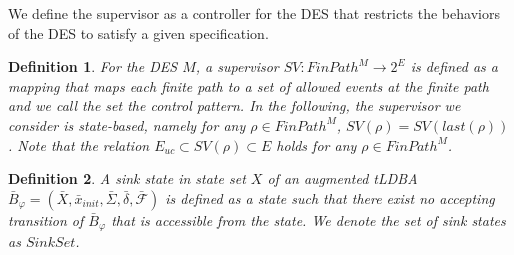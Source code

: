 \documentclass[letterpaper, 10 pt, conference, dvipdfmx]{ieeeconf}
\newtheorem{definition}{Definition}
\begin{document}
We define the supervisor as a controller for the DES that restricts the behaviors of the DES to satisfy a given specification.

\begin{definition}
For the DES $M$,  a supervisor $SV : FinPath^{M} \rightarrow 2^E$ is defined as a mapping that maps each finite path to a set of allowed events at the finite path and we call the set the control pattern. In the following, the supervisor we consider is {\it state-based}, namely for any $\rho \in FinPath^{M}$, $SV(\rho) = SV(last(\rho))$. Note that the relation $E_{uc} \subset SV(\rho) \subset E$ holds for any $\rho \in FinPath^M$.
\end{definition}

\begin{definition}
  A sink state in state set $X$ of an augmented tLDBA $\bar{B}_{\varphi} = (\bar{X}, \bar{x}_{init},\bar{\Sigma},\bar{\delta},\bar{\mathcal{F}})$ is defined as a state such that there exist no accepting transition of $\bar{B}_{\varphi}$ that is accessible from the state. We denote the set of sink states as $Sink Set$.
\end{definition}
\end{document}
